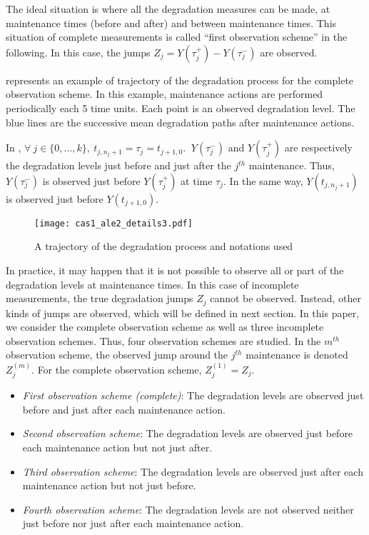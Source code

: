 The ideal situation is where all the degradation measures can be made, at maintenance times (before and after) and between maintenance times. This situation of complete measurements is called ``first observation scheme'' in the following. In this case, the jumps $Z_j = Y(\tau_{j}^+) - Y(\tau_{j}^-)$ are observed.

 represents an example of trajectory of the degradation process for the complete observation scheme. In this example, maintenance actions are performed periodically each 5 time units. Each point is an observed degradation level. The blue lines are the successive mean degradation paths after maintenance actions.

In , $\forall\ j \in \{0,...,k\}, \ t_{j,n_j+1}=\tau_j=t_{j+1,0}$. $\ Y(\tau_j^-)$  and $Y(\tau_j^+)$ are respectively the degradation levels just before and just after the $j^{th}$ maintenance. Thus, $Y(\tau_j^-)$ is observed just before $Y(\tau_j^+)$ at time $\tau_j$. In the same way, $Y(t_{j,n_j+1})$ is observed just before $Y(t_{j+1,0})$.

\begin{figure}[htbp]
\centering
\texttt{[image: cas1\_ale2\_details3.pdf]} 
\caption{A trajectory of the degradation process and notations used}
\label{figure:fig_intro}
\end{figure}

In practice, it may happen that it is not possible to observe all or part of the degradation levels at maintenance times. In this case of incomplete measurements, the true degradation jumps $Z_j$ cannot be observed. Instead, other kinds of jumps are observed, which will be defined in next section. In this paper, we consider the complete observation scheme as well as three incomplete observation schemes. Thus, four observation schemes are studied. In the $m^{th}$ observation scheme, the observed jump around the $j^{th}$ maintenance is denoted $Z_j^{(m)}$. For the complete observation scheme, $Z_j^{(1)}=Z_j$.

\begin{itemize}

\item {\it First observation scheme (complete)}: The degradation levels are observed just before and just after each maintenance action. 

\item {\it Second observation scheme}: The degradation levels are observed just before each maintenance action but not just after.

\item {\it Third observation scheme}: The degradation levels are observed just after each maintenance action but not just before.

\item {\it Fourth observation scheme}: The degradation levels are not observed neither just before nor just after each maintenance action. 

\end{itemize}

